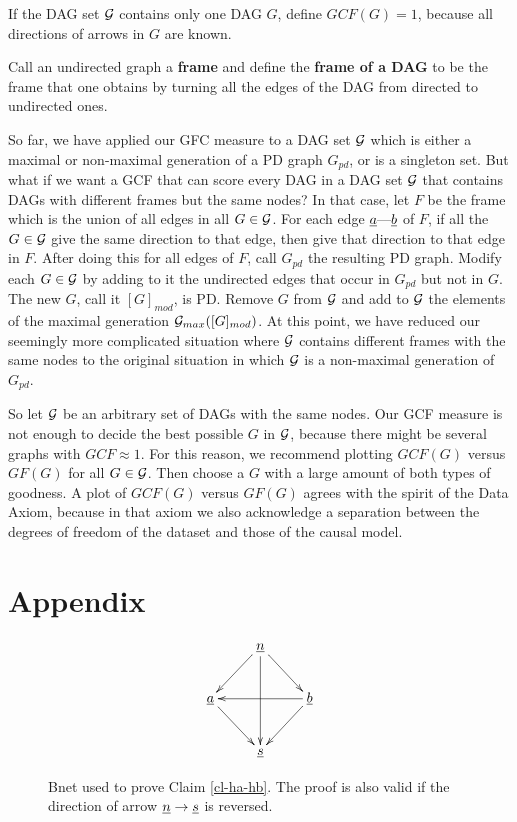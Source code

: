 \documentclass[12pt]{article}
\begin{document}
If the DAG set ${\cal G}$ 
contains only one DAG $G$,
define $GCF(G)=1$, because all
directions of 
arrows in $G$ are known.

Call an undirected graph a {\bf frame}
and define the
{\bf frame of a DAG}
to be the frame that one obtains
by turning
all the edges of the DAG from directed 
to undirected ones.

So far, we 
have applied our GFC measure
 to a DAG set ${\cal G}$
which is
either a maximal or 
non-maximal generation
of  a PD graph $G_{pd}$,
or is a singleton set.
But what if we want a GCF
that can score every DAG
in a  DAG set
${\cal G}$ that contains
DAGs with different frames
but the same nodes?
In that case, 
let $F$
be the frame
which 
is the union of 
all edges in all $G\in {\cal G}$.
For each edge ${\underline{a}}\text{---}{\underline{b}}$ of $F$,
if all the $G\in {\cal G}$
give the same direction
to that edge, then give that direction
to that edge in $F$.
After doing this for
all edges of $F$,
call $G_{pd} $ the resulting 
PD graph.
Modify each $G\in {\cal G}$
by adding to it the undirected edges
that occur in $G_{pd}$
but not in $G$.
The new $G$, call it $[G]_{mod}$,
is PD. Remove $G$ from ${\cal G}$
and add to ${\cal G}$
the elements of
the maximal generation ${\cal G}_{max}([G]_{mod})$.
At this point,
we have reduced our
seemingly more 
complicated situation
where ${\cal G}$ contains
different frames with the same nodes
to the original situation
in which ${\cal G}$
is a non-maximal 
generation of $G_{pd}$.



So let ${\cal G}$
be an arbitrary set of
DAGs with the same nodes.
Our GCF  measure
is not enough to
decide the best 
possible $G$ in ${\cal G}$,
because there might 
be several graphs with 
$GCF\approx 1$.
For this reason,
we recommend
plotting $GCF(G)$ 
versus $GF(G)$
for all $G\in{\cal G}$.
Then  choose a $G$ with a
large amount
of both types of goodness.
A plot of 
$GCF(G)$
versus $GF(G)$
agrees with the spirit of
the Data 
Axiom,
because in that axiom 
we also acknowledge a separation between the
degrees of freedom of the
dataset  and 
those of the causal model.

\appendix

\section{Appendix}

\begin{figure}[h!]
$$
\xymatrix{
&\rvn\ar[ld]\ar[rd]\ar[dd]
\\
\rva\ar[rd]
&&\rvb\ar[ll]
\ar[ld]
\\
&
\rvs
}
$$
\caption{Bnet used 
to prove Claim \ref{cl-ha-hb}.
The proof is also valid if the
direction of
arrow ${\underline{n}}\rightarrow{\underline{s}}$
is reversed. }
\label{fig-ha-hb}
\end{figure} 
\end{document}
